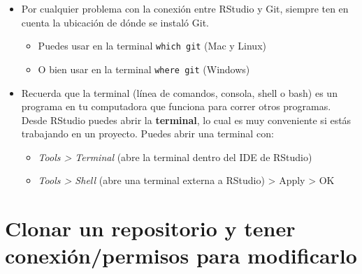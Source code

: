 \documentclass[
  spanish,
  12pt,
  letterpaper,
  DIV=11,
  numbers=noendperiod]{scrreprt}
\begin{document}
\begin{itemize}
\item
  Por cualquier problema con la conexión entre RStudio y Git, siempre
  ten en cuenta la ubicación de dónde se instaló Git.

  \begin{itemize}
  \item
    Puedes usar en la terminal \texttt{which\ git} (Mac y Linux)
  \item
    O bien usar en la terminal \texttt{where\ git} (Windows)
  \end{itemize}
\item
  Recuerda que la terminal (línea de comandos, consola, shell o bash) es
  un programa en tu computadora que funciona para correr otros
  programas. Desde RStudio puedes abrir la \textbf{terminal}, lo cual es
  muy conveniente si estás trabajando en un proyecto. Puedes abrir una
  terminal con:

  \begin{itemize}
  \item
    \emph{Tools \textgreater{} Terminal} (abre la terminal dentro del
    IDE de RStudio)
  \item
    \emph{Tools \textgreater{} Shell} (abre una terminal externa a
    RStudio) \textgreater{} Apply \textgreater{} OK
  \end{itemize}
\end{itemize}

\section{Clonar un repositorio y tener conexión/permisos para
modificarlo}\label{clonar-un-repositorio-y-tener-conexiuxf3npermisos-para-modificarlo}
\end{document}

